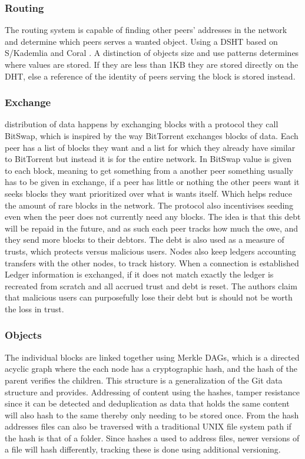 \subsubsection{Routing}
The routing system is capable of finding other peers' addresses in the network and determine which peers serves a wanted object. Using a \acs{DSHT} based on S/Kademlia and Coral \cite{baumgart2007skademlia, freedman2004coral}. A distinction of objects size and use patterns determines where values are stored. If they are less than 1KB they are stored directly on the \acs{DHT}, else a reference of the identity of peers serving the block is stored instead. 

\subsubsection{Exchange}
distribution of data happens by exchanging blocks with a protocol they call BitSwap, which is inspired by the way BitTorrent exchanges blocks of data. Each peer has a list of blocks they want and a list for which they already have similar to BitTorrent but instead it is for the entire network. In BitSwap value is given to each block, meaning to get something from a another peer something usually has to be given in exchange, if a peer has little or nothing the other peers want it seeks blocks they want prioritized over what is wants itself. Which helps reduce the amount of rare blocks in the network.
The protocol also incentivises seeding even when the peer does not currently need any blocks. The idea is that this debt will be repaid in the future, and as such each peer tracks how much the owe, and they send more blocks to their debtors. The debt is also used as a measure of trusts, which protects versus malicious users.
Nodes also keep ledgers accounting transfers with the other nodes, to track history. When a connection is established Ledger information is exchanged, if it does not match exactly the ledger is recreated from scratch and all accrued trust and debt is reset. The authors claim that malicious users can purposefully lose their debt but is should not be worth the loss in trust.

\subsubsection{Objects}
The individual blocks are linked together using Merkle \acs{DAG}s, which is a directed acyclic graph where the each node has a cryptographic hash, and the hash of the parent verifies the children. This structure is a generalization of the Git data structure and provides. Addressing of content using the hashes, tamper resistance since it can be detected and deduplication as data that holds the same content will also hash to the same thereby only needing to be stored once. From the hash addresses files can also be traversed with a traditional UNIX file system path if the hash is that of a folder.
Since hashes a used to address files, newer versions of a file will hash differently, tracking these is done using additional versioning.


